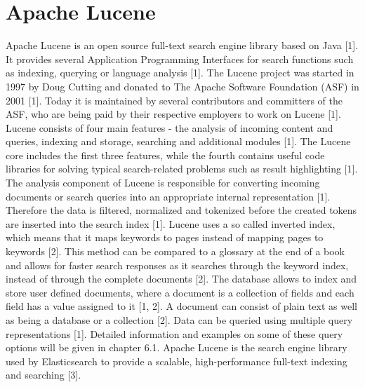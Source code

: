 \chapter{Apache Lucene}

Apache Lucene is an open source full-text search engine library based on Java [1]. It provides several Application Programming Interfaces for search functions such as indexing, querying or language analysis [1]. 
The Lucene project was started in 1997 by Doug Cutting and donated to The Apache Software Foundation (ASF) in 2001 [1]. Today it is maintained by several contributors and committers of the ASF, who are being paid by their respective employers to work on Lucene [1].
Lucene consists of four main features - the analysis of incoming content and queries, indexing and storage, searching and additional modules [1]. The Lucene core includes the first three features, while the fourth contains useful code libraries for solving typical search-related problems such as result highlighting [1].
The analysis component of Lucene is responsible for converting incoming documents or search queries into an appropriate internal representation [1]. Therefore the data is filtered, normalized and tokenized before the created tokens are inserted into the search index [1]. 
Lucene uses a so called inverted index, which means that it maps keywords to pages instead of mapping pages to keywords [2]. This method can be compared to a glossary at the end of a book and allows for faster search responses as it searches through the keyword index, instead of through the complete documents [2]. 
The database allows to index and store user defined documents, where a document is a collection of fields and each field has a value assigned to it [1, 2]. A document can consist of plain text as well as being a database or a collection [2]. 
Data can be queried using multiple query representations [1]. Detailed information and examples on some of these query options will be given in chapter 6.1.    
Apache Lucene is the search engine library used by Elasticsearch to provide a scalable, high-performance full-text indexing and searching [3].
